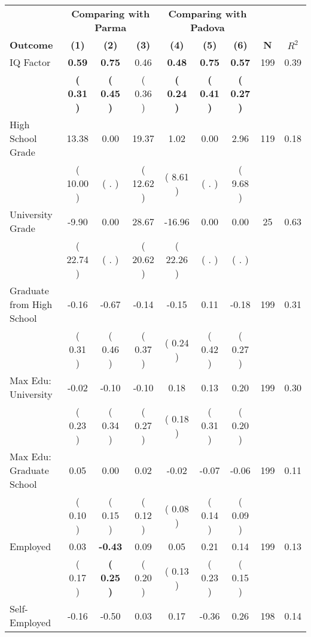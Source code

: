\begin{tabular}{lcccccccc}
\toprule
 & \multicolumn{3}{c}{\textbf{Comparing with Parma}} & \multicolumn{3}{c}{\textbf{Comparing with Padova}} & \\
\cmidrule(lr){2-4} \cmidrule(lr){5-7} 
 \textbf{Outcome} & \textbf{(1)} & \textbf{(2)} & \textbf{(3)} & \textbf{(4)} & \textbf{(5)} & \textbf{(6)} & \textbf{N} & \textbf{$ R^2$} \\
\midrule
IQ Factor & \textbf{     0.59} & \textbf{     0.75} &      0.46 & \textbf{     0.48} & \textbf{     0.75} & \textbf{     0.57} & 199 &       0.39 \\ 
 & \textbf{(     0.31 )} & \textbf{(     0.45 )} & (     0.36 ) & \textbf{(     0.24 )} & \textbf{(     0.41 )} & \textbf{(     0.27 )} & \\
High School Grade &     13.38 &      0.00 &     19.37 &      1.02 &      0.00 &      2.96 & 119 &       0.18 \\ 
 & (    10.00 ) & (        . ) & (    12.62 ) & (     8.61 ) & (        . ) & (     9.68 ) & \\
University Grade &     -9.90 &      0.00 &     28.67 &    -16.96 &      0.00 &      0.00 & 25 &       0.63 \\ 
 & (    22.74 ) & (        . ) & (    20.62 ) & (    22.26 ) & (        . ) & (        . ) & \\
Graduate from High School &     -0.16 &     -0.67 &     -0.14 &     -0.15 &      0.11 &     -0.18 & 199 &       0.31 \\ 
 & (     0.31 ) & (     0.46 ) & (     0.37 ) & (     0.24 ) & (     0.42 ) & (     0.27 ) & \\
Max Edu: University &     -0.02 &     -0.10 &     -0.10 &      0.18 &      0.13 &      0.20 & 199 &       0.30 \\ 
 & (     0.23 ) & (     0.34 ) & (     0.27 ) & (     0.18 ) & (     0.31 ) & (     0.20 ) & \\
Max Edu: Graduate School &      0.05 &      0.00 &      0.02 &     -0.02 &     -0.07 &     -0.06 & 199 &       0.11 \\ 
 & (     0.10 ) & (     0.15 ) & (     0.12 ) & (     0.08 ) & (     0.14 ) & (     0.09 ) & \\
Employed &      0.03 & \textbf{    -0.43} &      0.09 &      0.05 &      0.21 &      0.14 & 199 &       0.13 \\ 
 & (     0.17 ) & \textbf{(     0.25 )} & (     0.20 ) & (     0.13 ) & (     0.23 ) & (     0.15 ) & \\
Self-Employed &     -0.16 &     -0.50 &      0.03 &      0.17 &     -0.36 &      0.26 & 198 &       0.14 \\ 

\end{tabular}
